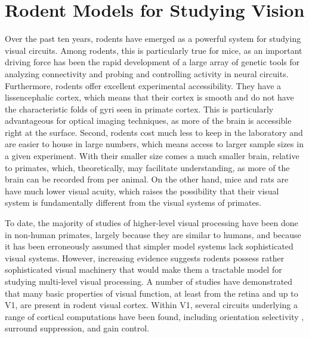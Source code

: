 \section{Rodent Models for Studying Vision}
Over the past ten years, rodents have emerged as a powerful system for studying visual circuits. Among rodents, this is particularly true for mice, as an important driving force has been the rapid development of a large array of genetic tools for analyzing connectivity and probing and controlling activity in neural circuits\cite{Luo2008, Luo2018}. Furthermore, rodents offer excellent experimental accessibility. They have a lissencephalic cortex, which means that their cortex is smooth and do not have the characteristic folds of gyri seen in primate cortex. This is particularly advantageous for optical imaging techniques, as more of the brain is accessible right at the surface. Second, rodents cost much less to keep in the laboratory and are easier to house in large numbers, which means access to larger sample sizes in a given experiment. With their smaller size comes a much smaller brain, relative to primates, which, theoretically, may facilitate understanding, as more of the brain can be recorded from per animal. On the other hand, mice and rats are have much lower visual acuity, which raises the possibility that their visual system is fundamentally different from the visual systems of primates. 

To date, the majority of studies of higher-level visual processing have been done in non-human primates, largely because they are similar to humans, and because it has been erroneously assumed that simpler model systems lack sophisticated visual systems. However, increasing evidence suggests rodents possess rather sophisticated visual machinery that would make them a tractable model for studying multi-level visual processing. A number of studies have demonstrated that many basic properties of visual function, at least from the retina and up to V1, are present in rodent visual cortex\cite{HubermanNiell2011}. Within V1, several circuits underlying a range of cortical computations have been found, including orientation selectivity \cite{Ko2011, Lien2013TunedCircuits}, surround suppression\cite{Adesnik2012}, and gain control\cite{Atallah2012}. 

